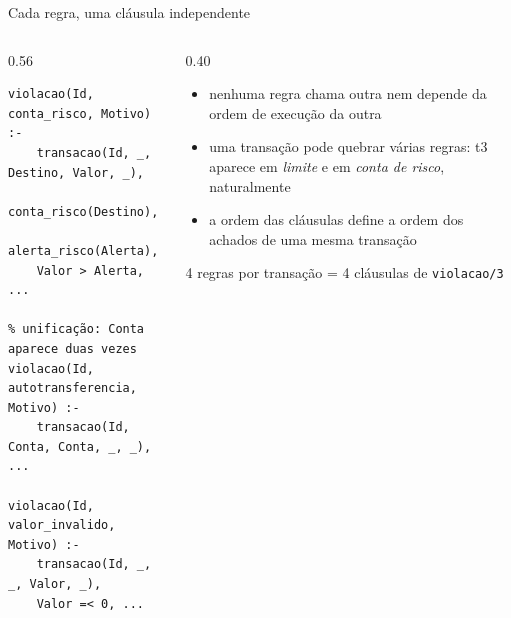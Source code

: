 \documentclass[aspectratio=169,11pt,xcolor=table]{beamer}
\newcommand{\destaque}[1]{%
  \begin{center}\colorbox{accent!10}{\parbox{0.92\linewidth}{\centering\strut #1\strut}}\end{center}}
\begin{document}
\begin{frame}[fragile]{Cada regra, uma cláusula independente}
  \begin{columns}[T]
    \begin{column}{0.56\textwidth}
\begin{lstlisting}[style=pl]
violacao(Id, conta_risco, Motivo) :-
    transacao(Id, _, Destino, Valor, _),
    conta_risco(Destino),
    alerta_risco(Alerta),
    Valor > Alerta, ...

% unificação: Conta aparece duas vezes
violacao(Id, autotransferencia, Motivo) :-
    transacao(Id, Conta, Conta, _, _), ...

violacao(Id, valor_invalido, Motivo) :-
    transacao(Id, _, _, Valor, _),
    Valor =< 0, ...
\end{lstlisting}
    \end{column}
    \begin{column}{0.40\textwidth}
      \small
      \begin{itemize}
        \item nenhuma regra chama outra nem depende da ordem de execução da
              outra
        \item uma transação pode quebrar várias regras: t3 aparece em
              \emph{limite} e em \emph{conta de risco}, naturalmente
        \item a ordem das cláusulas define a ordem dos achados de uma mesma
              transação
      \end{itemize}
      \vspace{4pt}
      \destaque{\footnotesize 4 regras por transação = 4 cláusulas de
      \texttt{violacao/3}}
    \end{column}
  \end{columns}
\end{frame}
\end{document}
